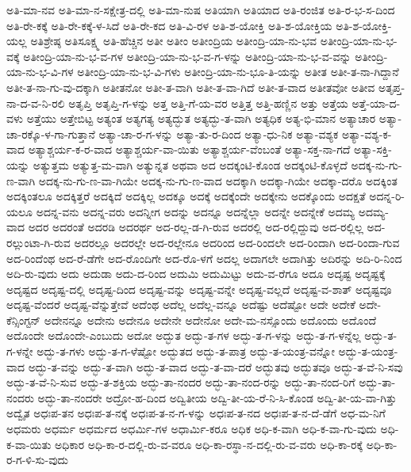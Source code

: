 {ಅತಿ-ಮಾ-ನವ
ಅತಿ-ಮಾ-ನ-ಸಕ್ಷೇತ್ರ-ದಲ್ಲಿ
ಅತಿ-ಮಾ-ನುಷ
ಅತಿಯಾಗಿ
ಅತಿಯಾದ
ಅತಿ-ರಂಜಿತ
ಅತಿ-ರ-ಭ-ಸ-ದಿಂದ
ಅತಿ-ರೇ-ಕಕ್ಕೆ
ಅತಿ-ರೇ-ಕಕ್ಕೆ-ಳ-ಸಿದೆ
ಅತಿ-ರೇ-ಕದ
ಅತಿ-ವಿ-ರಳ
ಅತಿ-ಶ-ಯೋಕ್ತಿ
ಅತಿ-ಶ-ಯೋಕ್ತಿಯ
ಅತಿ-ಶ-ಯೋಕ್ತಿ-ಯಲ್ಲ
ಅತಿಶ್ರೇಷ್ಠ
ಅತಿಸೂಕ್ಷ್ಮ
ಅತಿ-ಹೆಚ್ಚಿನ
ಅತೀ
ಅತೀಂ
ಅತೀಂದ್ರಿಯ
ಅತೀಂದ್ರಿ-ಯಾ-ನು-ಭವ
ಅತೀಂದ್ರಿ-ಯಾ-ನು-ಭ-ವಕ್ಕೆ
ಅತೀಂದ್ರಿ-ಯಾ-ನು-ಭ-ವ-ಗಳ
ಅತೀಂದ್ರಿ-ಯಾ-ನು-ಭ-ವ-ಗ-ಳನ್ನು
ಅತೀಂದ್ರಿ-ಯಾ-ನು-ಭ-ವ-ವನ್ನು
ಅತೀಂದ್ರಿ-ಯಾ-ನು-ಭ-ವಿ-ಗಳ
ಅತೀಂದ್ರಿ-ಯಾ-ನು-ಭ-ವಿ-ಗಳು
ಅತೀಂದ್ರಿ-ಯಾ-ನು-ಭೂ-ತಿ-ಯನ್ನು
ಅತೀತ
ಅತೀ-ತ-ನಾ-ಗಿದ್ದಾನೆ
ಅತೀ-ತ-ನಾ-ಗು-ವು-ದಕ್ಕಾಗಿ
ಅತೀತನೋ
ಅತೀ-ತ-ವಾಗಿ
ಅತೀ-ತ-ವಾ-ಗಿದೆ
ಅತೀ-ತ-ವಾದ
ಅತೀತವೋ
ಅತೀವ
ಅತೃಪ್ತ-ನಾ-ದ-ವ-ನಿ-ರಲಿ
ಅತೃಪ್ತಿ
ಅತೃಪ್ತಿ-ಗ-ಳನ್ನು
ಅತ್ತ
ಅತ್ತಿ-ಗೆ-ಯ-ವರ
ಅತ್ತಿತ್ತ
ಅತ್ತಿ-ಹಣ್ಣಿನ
ಅತ್ತು
ಅತ್ತೆಯ
ಅತ್ತೆ-ಯಾ-ದ-ವಳು
ಅತ್ತೆಯು
ಅತ್ತೇಬಿಟ್ಟ
ಅತ್ಯಂತ
ಅತ್ಯಗತ್ಯ
ಅತ್ಯದ್ಭುತ
ಅತ್ಯದ್ಭು-ತ-ವಾಗಿ
ಅತ್ಯಧಿಕ
ಅತ್ಯ-ಭಿ-ಮಾನ
ಅತ್ಯಾಚಾರ
ಅತ್ಯಾ-ಚಾ-ರಕ್ಕೊ-ಳ-ಗಾ-ಗುತ್ತಾನೆ
ಅತ್ಯಾ-ಚಾ-ರ-ಗ-ಳನ್ನು
ಅತ್ಯಾ-ತು-ರ-ದಿಂದ
ಅತ್ಯಾ-ಧು-ನಿಕ
ಅತ್ಯಾ-ವಶ್ಯಕ
ಅತ್ಯಾ-ವಶ್ಯ-ಕ-ವಾದ
ಅತ್ಯಾಶ್ಚರ್ಯ-ಕ-ರ-ವಾದ
ಅತ್ಯಾಶ್ಚರ್ಯ-ವಾ-ಯಿತು
ಅತ್ಯಾಶ್ಚರ್ಯ-ವೆಂಬಂತೆ
ಅತ್ಯಾ-ಸಕ್ತ-ನಾ-ಗದೆ
ಅತ್ಯಾ-ಸಕ್ತಿ-ಯನ್ನು
ಅತ್ಯುತ್ತಮ
ಅತ್ಯುತ್ತ-ಮ-ವಾಗಿ
ಅತ್ಯುನ್ನತ
ಅಥವಾ
ಅದ
ಅದಕ್ಕಂಟಿ-ಕೊಂಡ
ಅದಕ್ಕಂಟಿ-ಕೊಳ್ಳದೆ
ಅದಕ್ಕ-ನು-ಗು-ಣ-ವಾಗಿ
ಅದಕ್ಕ-ನು-ಗು-ಣ-ವಾ-ಗಿಯೇ
ಅದಕ್ಕ-ನು-ಗು-ಣ-ವಾದ
ಅದಕ್ಕಾಗಿ
ಅದಕ್ಕಾ-ಗಿಯೇ
ಅದಕ್ಕಾ-ದರೊ
ಅದಕ್ಕಿಂತ
ಅದಕ್ಕಿಂತಲೂ
ಅದಕ್ಕಿತ್ತರೆ
ಅದಕ್ಕಿದೆ
ಅದಕ್ಕಿಲ್ಲ
ಅದಕ್ಕೂ
ಅದಕ್ಕೆ
ಅದಕ್ಕೆಂದೇ
ಅದಕ್ಕೇನು
ಅದಕ್ಕೊಂದು
ಅದಕ್ಷತೆ
ಅದನ್ನ-ರಿ-ಯಲೂ
ಅದನ್ನ-ವನು
ಅದನ್ನ-ವರು
ಅದನ್ನೀಗ
ಅದನ್ನು
ಅದನ್ನೂ
ಅದನ್ನೆಲ್ಲಾ
ಅದನ್ನೇ
ಅದನ್ನೇಕೆ
ಅದಮ್ಯ
ಅದಮ್ಯ-ವಾದ
ಅದರ
ಅದರಂತೆ
ಅದರಡಿ
ಅದರರ್ಥ
ಅದ-ರಲ್ಲ-ಡ-ಗಿ-ರುವ
ಅದರಲ್ಲಿ
ಅದ-ರಲ್ಲಿದ್ದುವು
ಅದ-ರಲ್ಲಿಲ್ಲ
ಅದ-ರಲ್ಲುಂಟಾ-ಗಿ-ರುವ
ಅದರಲ್ಲೂ
ಅದರಲ್ಲೇ
ಅದ-ರಲ್ಲೇನೂ
ಅದರಿಂದ
ಅದ-ರಿಂದಲೇ
ಅದ-ರಿಂದಾಗಿ
ಅದ-ರಿಂದಾ-ಗುವ
ಅದ-ರಿಂದೆಂಥ
ಅದ-ರೆ-ಡೆಗೇ
ಅದ-ರೊಂದಿಗೇ
ಅದ-ರೊ-ಳಗೆ
ಅದಲ್ಲ
ಅದಾಗಲೇ
ಅದಾಗಿತ್ತು
ಅದಿರನ್ನು
ಅದಿ-ರಿ-ನಿಂದ
ಅದಿ-ರು-ವುದು
ಅದು
ಅದುಡಾ
ಅದು-ದ-ರಿಂದ
ಅದುಮಿ
ಅದುಮಿಟ್ಟು
ಅದು-ವ-ರೆಗೂ
ಅದೂ
ಅದೃಷ್ಟ
ಅದೃಷ್ಟಕ್ಕೆ
ಅದೃಷ್ಟದ
ಅದೃಷ್ಟ-ದಲ್ಲಿ
ಅದೃಷ್ಟ-ದಿಂದ
ಅದೃಷ್ಟ-ವನ್ನು
ಅದೃಷ್ಟ-ವನ್ನೇ
ಅದೃಷ್ಟ-ವಲ್ಲದೆ
ಅದೃಷ್ಟ-ವ-ಶಾತ್
ಅದೃಷ್ಟವೂ
ಅದೃಷ್ಟ-ವೆಂದರೆ
ಅದೃಷ್ಟ-ವೆನ್ನುತ್ತೇವೆ
ಅದೆಂಥ
ಅದೆಲ್ಲ
ಅದೆಲ್ಲ-ವನ್ನೂ
ಅದೆಷ್ಟು
ಅದೆಷ್ಟೋ
ಅದೇ
ಅದೇಕೆ
ಅದೇ-ಕೆನ್ಸಿಂಗ್ಟನ್
ಅದೇನನ್ನೂ
ಅದೇನು
ಅದೇನೂ
ಅದೇನೇ
ಅದೇನೋ
ಅದೇ-ಮ-ನಸ್ಸೊಂದು
ಅದೊಂದು
ಅದೊಂದೆ
ಅದೊಂದೇ
ಅದೊಂದೇ-ಎಂಬುದು
ಅದೋ
ಅದ್ಭುತ
ಅದ್ಭು-ತ-ಗಳ
ಅದ್ಭು-ತ-ಗ-ಳನ್ನು
ಅದ್ಭು-ತ-ಗ-ಳನ್ನೆಲ್ಲ
ಅದ್ಭು-ತ-ಗ-ಳನ್ನೇ
ಅದ್ಭು-ತ-ಗಳು
ಅದ್ಭು-ತ-ಗ-ಳೆಷ್ಟೋ
ಅದ್ಭುತದ
ಅದ್ಭು-ತ-ಪಾತ್ರ
ಅದ್ಭು-ತ-ಯಂತ್ರ-ವನ್ನೋ
ಅದ್ಭು-ತ-ಯಂತ್ರ-ವಾದ
ಅದ್ಭು-ತ-ವನ್ನು
ಅದ್ಭು-ತ-ವಾಗಿ
ಅದ್ಭು-ತ-ವಾದ
ಅದ್ಭು-ತ-ವಾ-ದರೆ
ಅದ್ಭುತವು
ಅದ್ಭುತವೂ
ಅದ್ಭು-ತ-ವೆ-ನಿ-ಸವು
ಅದ್ಭು-ತ-ವೆ-ನಿ-ಸುವ
ಅದ್ಭು-ತ-ಶಕ್ತಿಯ
ಅದ್ಭು-ತಾ-ನಂದರ
ಅದ್ಭು-ತಾ-ನಂದ-ರನ್ನು
ಅದ್ಭು-ತಾ-ನಂದ-ರಿಗೆ
ಅದ್ಭು-ತಾ-ನಂದರು
ಅದ್ಭು-ತಾ-ನಂದರೇ
ಅದ್ರೋ-ಹ-ದಿಂದ
ಅದ್ವಿತೀಯ
ಅದ್ವಿ-ತೀ-ಯ-ರೆ-ನಿ-ಸಿ-ಕೊಂಡ
ಅದ್ವಿ-ತೀ-ಯ-ವಾ-ಗಿತ್ತು
ಅದ್ವೈತ
ಅಧಃಪ-ತನ
ಅಧಃಪ-ತ-ನಕ್ಕೆ
ಅಧಃಪ-ತ-ನ-ಗ-ಳನ್ನು
ಅಧಃಪ-ತ-ನದ
ಅಧಃಪ-ತ-ನ-ದೆ-ಡೆಗೆ
ಅಧ-ಮ-ನಿಗೆ
ಅಧಮರು
ಅಧರ್ಮ
ಅಧರ್ಮದ
ಅಧರ್ಮಿ-ಗಳ
ಅಧಾರ್ಮಿ-ಕರೂ
ಅಧಿಕ
ಅಧಿ-ಕ-ವಾಗಿ
ಅಧಿ-ಕ-ವಾ-ಗು-ವುದು
ಅಧಿ-ಕ-ವಾ-ಯಿತು
ಅಧಿಕಾರ
ಅಧಿ-ಕಾ-ರ-ದಲ್ಲಿ-ರು-ವ-ವರೂ
ಅಧಿ-ಕಾ-ರಸ್ಥಾ-ನ-ದಲ್ಲಿ-ರು-ವ-ವರು
ಅಧಿ-ಕಾ-ರಕ್ಕೆ
ಅಧಿ-ಕಾ-ರ-ಗ-ಳಿ-ಸು-ವುದು
}
